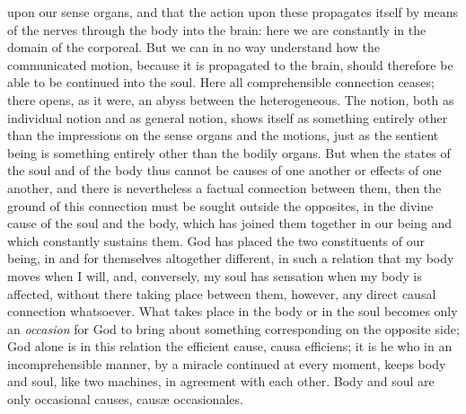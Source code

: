 upon our sense organs, and that the action upon these propagates itself
by means of the nerves through the body into the brain: here we are
constantly in the domain of the corporeal. But we can in no way
understand how the communicated motion, because it is propagated to the
brain, should therefore be able to be continued into the soul. Here all
comprehensible connection ceases; there opens, as it were, an abyss
between the heterogeneous. The notion, both as individual notion and as
general notion, shows itself as something entirely other than the
impressions on the sense organs and the motions, just as the sentient
being is something entirely other than the bodily organs. But when the
states of the soul and of the body thus cannot be causes of one another
or effects of one another, and there is nevertheless a factual
connection between them, then the ground of this connection must be
sought outside the opposites, in the divine cause of the soul and the
body, which has joined them together in our being and which constantly
sustains them. God has placed the two constituents of our being, in and
for themselves altogether different, in such a relation that my body
moves when I will, and, conversely, my soul has sensation when
my body is affected, without there taking place between them, however,
any direct causal connection whatsoever. What takes place in the body or
in the soul becomes only an \emph{occasion} for God to bring about
something corresponding on the opposite side; God alone is in this
relation the efficient cause, causa efficiens; it is he who in an
incomprehensible manner, by a miracle continued at every moment, keeps
body and soul, like two machines, in agreement with each other. Body and
soul are only occasional causes, causæ occasionales.

